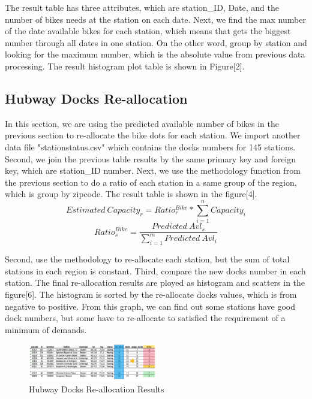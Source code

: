 \documentclass[journal, letterpaper]{IEEEtran}
\begin{document}
The result table has three attributes, which are station\_ID, Date, and the number of bikes needs at the station on each date. Next, we find the max number of the date available bikes for each station, which means that gets the biggest number through all dates in one station. On the other word, group by station and looking for the maximum number, which is the absolute value from previous data processing. The result histogram  plot table is shown in Figure[2].

\subsection{Hubway Docks Re-allocation}
In this section, we are using the predicted available number of bikes in the previous section to re-allocate the bike dots for each station. We import another data file "stationstatus.csv" which contains the docks numbers for 145 stations. Second, we join the previous table results by the same primary key and foreign key, which are station\_ID number. Next, we use the methodology function from the previous section to do a ratio of each station in a same group of the region, which is group by zipcode. The result table is shown in the figure[4]. 
$$Estimated \ Capacity_{r} = Ratio_{r}^{Bike} * \sum_{i=1}^{n}Capacity_{i}$$
$$Ratio_{s}^{Bike} = \frac{Predicted \ Avl_{s}}{\sum_{i=1}^{m}Predicted \ Avl_{i}}$$

Second, use the methodology to re-allocate each station, but the sum of total stations in each region is constant. Third, compare the new docks number in each station. The final re-allocation results are ployed as histogram and scatters in the figure[6]. The histogram is sorted by the re-allocate docks values, which is from negative to positive. From this graph, we can find out some stations have good dock numbers, but some have to re-allocate to satisfied the requirement of a minimum of demands. 

\begin{figure}
  \includegraphics[width=0.5\textwidth]{resultsheet.jpg}
  \caption{Hubway Docks Re-allocation Results}
  \label{fig:4}
\end{figure}
\end{document}

